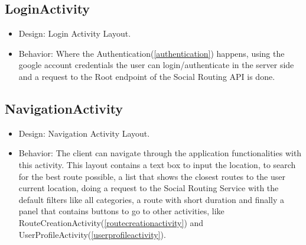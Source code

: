 \subsection{LoginActivity}
\begin{itemize}
        \item Design: Login Activity Layout.\cite{loginactivitylayout}
        \item Behavior: Where the Authentication(\ref{authentication}) happens, using the google account credentials the user can login/authenticate in the server side and a
request to the Root endpoint of the Social Routing API is done.
\end{itemize}

\subsection{NavigationActivity}
\begin{itemize}
        \item Design: Navigation Activity Layout.\cite{navigationactivitylayout}
        \item Behavior: The client can navigate through the application functionalities with this activity. This layout contains a text box to input the location, to search for the best 
route possible, a list that shows the closest routes to the user current location, doing a request to the Social Routing Service with the default filters like all categories,
a route with short duration and finally a panel that contains buttons to go to other activities, like RouteCreationActivity(\ref{routecreationactivity}) and 
UserProfileActivity(\ref{userprofileactivity}).
\end{itemize}

